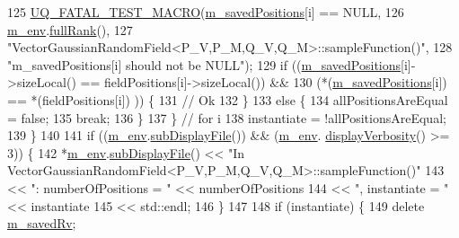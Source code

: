 \begin{DoxyCode}
125       \hyperlink{_defines_8h_a56d63d18d0a6d45757de47fcc06f574d}{UQ\_FATAL\_TEST\_MACRO}(\hyperlink{class_q_u_e_s_o_1_1_vector_gaussian_random_field_aa51f310fb54dd4807522a0e72be61acd}{m\_savedPositions}[i] == NULL,
126                           \hyperlink{class_q_u_e_s_o_1_1_vector_gaussian_random_field_ab4ad80cb336314fd0025abf0d37c5aa0}{m\_env}.\hyperlink{class_q_u_e_s_o_1_1_base_environment_a84a239e42ae443cf71db6e03e8159620}{fullRank}(),
127                           \textcolor{stringliteral}{"VectorGaussianRandomField<P\_V,P\_M,Q\_V,Q\_M>::sampleFunction()"},
128                           \textcolor{stringliteral}{"m\_savedPositions[i] should not be NULL"});
129       \textcolor{keywordflow}{if} ((\hyperlink{class_q_u_e_s_o_1_1_vector_gaussian_random_field_aa51f310fb54dd4807522a0e72be61acd}{m\_savedPositions}[i]->sizeLocal() == fieldPositions[i]->sizeLocal()) &&
130           (*(\hyperlink{class_q_u_e_s_o_1_1_vector_gaussian_random_field_aa51f310fb54dd4807522a0e72be61acd}{m\_savedPositions}[i])           == *(fieldPositions[i])          )) \{
131         \textcolor{comment}{// Ok}
132       \}
133       \textcolor{keywordflow}{else} \{
134         allPositionsAreEqual = \textcolor{keyword}{false};
135         \textcolor{keywordflow}{break};
136       \}
137     \} \textcolor{comment}{// for i}
138     instantiate = !allPositionsAreEqual;
139   \}
140 
141   \textcolor{keywordflow}{if} ((\hyperlink{class_q_u_e_s_o_1_1_vector_gaussian_random_field_ab4ad80cb336314fd0025abf0d37c5aa0}{m\_env}.\hyperlink{class_q_u_e_s_o_1_1_base_environment_a8a0064746ae8dddfece4229b9ad374d6}{subDisplayFile}()) && (\hyperlink{class_q_u_e_s_o_1_1_vector_gaussian_random_field_ab4ad80cb336314fd0025abf0d37c5aa0}{m\_env}.
      \hyperlink{class_q_u_e_s_o_1_1_base_environment_a1fe5f244fc0316a0ab3e37463f108b96}{displayVerbosity}() >= 3)) \{
142     *\hyperlink{class_q_u_e_s_o_1_1_vector_gaussian_random_field_ab4ad80cb336314fd0025abf0d37c5aa0}{m\_env}.\hyperlink{class_q_u_e_s_o_1_1_base_environment_a8a0064746ae8dddfece4229b9ad374d6}{subDisplayFile}() << \textcolor{stringliteral}{"In
       VectorGaussianRandomField<P\_V,P\_M,Q\_V,Q\_M>::sampleFunction()"}
143                             << \textcolor{stringliteral}{": numberOfPositions = "} << numberOfPositions
144                             << \textcolor{stringliteral}{", instantiate = "}       << instantiate
145                             << std::endl;
146   \}
147 
148   \textcolor{keywordflow}{if} (instantiate) \{
149     \textcolor{keyword}{delete} \hyperlink{class_q_u_e_s_o_1_1_vector_gaussian_random_field_a7e2ed5d146f65c8c4ddbd1d4e496647d}{m\_savedRv};

\end{DoxyCode}

